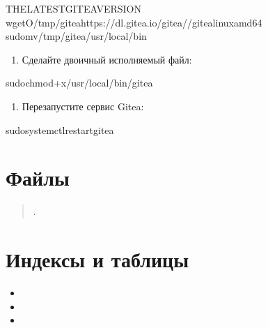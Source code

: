 \documentclass[letterpaper,10pt,russian]{sphinxmanual}
\begin{document}
\begin{sphinxVerbatim}[commandchars=\\\{\}]
\PYGZdl{}\PYGZlt{}THE\PYGZus{}LATEST\PYGZus{}GITEA\PYGZus{}VERSION\PYGZgt{}
\PYGZdl{}wget\PYGZhy{}O/tmp/giteahttps://dl.gitea.io/gitea//gitea\PYGZhy{}\PYGZhy{}linux\PYGZhy{}amd64
\PYGZdl{}sudomv/tmp/gitea/usr/local/bin
\end{sphinxVerbatim}
\begin{enumerate}
%
\setcounter{enumi}{2}
\item {} 
\sphinxAtStartPar
Сделайте двоичный исполняемый файл:

\end{enumerate}

\begin{sphinxVerbatim}[commandchars=\\\{\}]
\PYGZdl{}sudochmod+x/usr/local/bin/gitea
\end{sphinxVerbatim}
\begin{enumerate}
%
\setcounter{enumi}{3}
\item {} 
\sphinxAtStartPar
Перезапустите сервис Gitea:

\end{enumerate}

\begin{sphinxVerbatim}[commandchars=\\\{\}]
\PYGZdl{}sudosystemctlrestartgitea
\end{sphinxVerbatim}

\sphinxstepscope


\chapter{Файлы}
\label{\detokenize{files:id1}}\label{\detokenize{files::doc}}\begin{quote}

\sphinxAtStartPar
{}.
\end{quote}


\chapter{Индексы и таблицы}
\label{\detokenize{index:id1}}\begin{itemize}
\item {} 
\sphinxAtStartPar
{}

\item {} 
\sphinxAtStartPar
{}

\item {} 
\sphinxAtStartPar
{}

\end{itemize}
\end{document}
